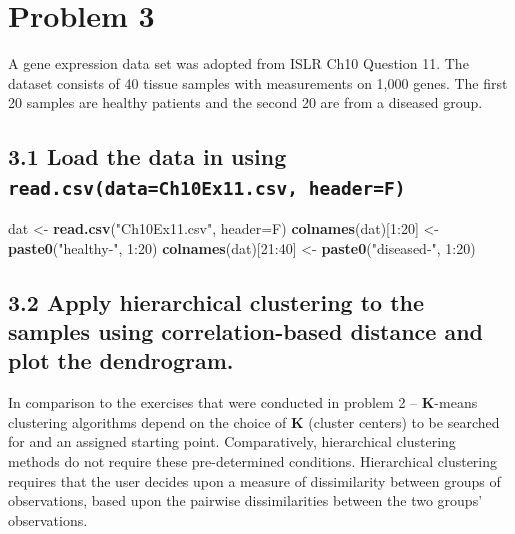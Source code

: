 \documentclass[]{article}
\newenvironment{Shaded}{\begin{snugshade}}{\end{snugshade}}
\newcommand{\KeywordTok}[1]{\textcolor[rgb]{0.13,0.29,0.53}{\textbf{{#1}}}}
\newcommand{\DataTypeTok}[1]{\textcolor[rgb]{0.13,0.29,0.53}{{#1}}}
\newcommand{\DecValTok}[1]{\textcolor[rgb]{0.00,0.00,0.81}{{#1}}}
\newcommand{\StringTok}[1]{\textcolor[rgb]{0.31,0.60,0.02}{{#1}}}
\newcommand{\NormalTok}[1]{{#1}}
\begin{document}
\section{Problem 3}\label{problem-3}

A gene expression data set was adopted from ISLR Ch10 Question 11. The
dataset consists of 40 tissue samples with measurements on 1,000 genes.
The first 20 samples are healthy patients and the second 20 are from a
diseased group.

\subsection{3.1 Load the data in using
\texttt{read.csv(data=Ch10Ex11.csv, header=F)}}\label{load-the-data-in-using-read.csvdatach10ex11.csv-headerf}

\begin{Shaded}
\begin{Highlighting}[]
\NormalTok{dat <-}\StringTok{ }\KeywordTok{read.csv}\NormalTok{(}\StringTok{"Ch10Ex11.csv"}\NormalTok{, }\DataTypeTok{header=}\NormalTok{F)}
\KeywordTok{colnames}\NormalTok{(dat)[}\DecValTok{1}\NormalTok{:}\DecValTok{20}\NormalTok{] <-}\StringTok{ }\KeywordTok{paste0}\NormalTok{(}\StringTok{"healthy-"}\NormalTok{, }\DecValTok{1}\NormalTok{:}\DecValTok{20}\NormalTok{)}
\KeywordTok{colnames}\NormalTok{(dat)[}\DecValTok{21}\NormalTok{:}\DecValTok{40}\NormalTok{] <-}\StringTok{ }\KeywordTok{paste0}\NormalTok{(}\StringTok{"diseased-"}\NormalTok{, }\DecValTok{1}\NormalTok{:}\DecValTok{20}\NormalTok{)}
\end{Highlighting}
\end{Shaded}

\subsection{3.2 Apply hierarchical clustering to the samples using
correlation-based distance and plot the
dendrogram.}\label{apply-hierarchical-clustering-to-the-samples-using-correlation-based-distance-and-plot-the-dendrogram.}

In comparison to the exercises that were conducted in problem 2 --
\textbf{K}-means clustering algorithms depend on the choice of
\textbf{K} (cluster centers) to be searched for and an assigned starting
point. Comparatively, hierarchical clustering methods do not require
these pre-determined conditions. Hierarchical clustering requires that
the user decides upon a measure of dissimilarity between groups of
observations, based upon the pairwise dissimilarities between the two
groups' observations.
\end{document}
